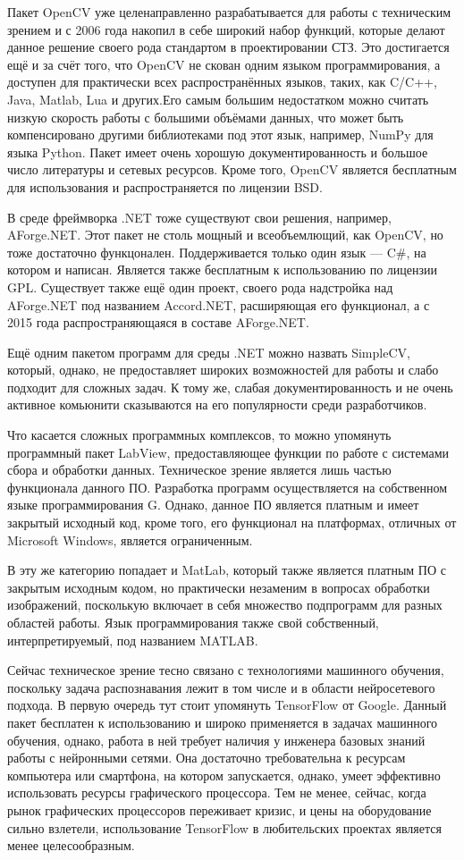 Пакет OpenCV уже целенаправленно разрабатывается для работы с техническим зрением и с 2006 года накопил в себе широкий набор функций, которые делают данное решение своего рода стандартом в проектировании СТЗ. Это достигается ещё и за счёт того, что OpenCV не скован одним языком программирования, а доступен для практически всех распространённых языков, таких, как C/C++, Java, Matlab, Lua и других.Его самым большим недостатком можно считать низкую скорость работы с большими объёмами данных, что может быть компенсировано другими библиотеками под этот язык, например, NumPy для языка Python. Пакет имеет очень хорошую документированность и большое число литературы и сетевых ресурсов. Кроме того, OpenCV является бесплатным для использования и распространяется по лицензии BSD.

В среде фреймворка .NET тоже существуют свои решения, например, AForge.NET. Этот пакет не столь мощный и всеобъемлющий, как OpenCV, но тоже достаточно функцонален. Поддерживается только один язык --- C\#, на котором и написан. Является также бесплатным к использованию по лицензии GPL. Существует также ещё один проект, своего рода надстройка над AForge.NET под названием Accord.NET, расширяющая его функционал, а с 2015 года распространяющаяся в составе AForge.NET.

Ещё одним пакетом программ для среды .NET можно назвать SimpleCV, который, однако, не предоставляет широких возможностей для работы и слабо подходит для сложных задач. К тому же, слабая документированность и не очень активное комьюнити сказываются на его популярности среди разработчиков.

Что касается сложных программных комплексов, то можно упомянуть программный пакет LabView, предоставляющее функции по работе с системами сбора и обработки данных. Техническое зрение является лишь частью функционала данного ПО. Разработка программ осуществляется на собственном языке программирования G. Однако, данное ПО является платным и имеет закрытый исходный код, кроме того, его функционал на платформах, отличных от Microsoft Windows, является ограниченным.

В эту же категорию попадает и MatLab, который также является платным ПО с закрытым исходным кодом, но практически незаменим в вопросах обработки изображений, посколькую включает в себя множество подпрограмм для разных областей работы. Язык программирования также свой собственный, интерпретируемый, под названием MATLAB.

Сейчас техническое зрение тесно связано с технологиями машинного обучения, поскольку задача распознавания лежит в том числе и в области нейросетевого подхода. В первую очередь тут стоит упомянуть TensorFlow от Google. Данный пакет бесплатен к использованию и широко применяется в задачах машинного обучения, однако, работа в ней требует наличия у инженера базовых знаний работы с нейронными сетями. Она достаточно требовательна к ресурсам компьютера или смартфона, на котором запускается, однако, умеет эффективно использовать ресурсы графического процессора. Тем не менее, сейчас, когда рынок графических процессоров переживает кризис, и цены на оборудование сильно взлетели, использование TensorFlow в любительских проектах является менее целесообразным.

